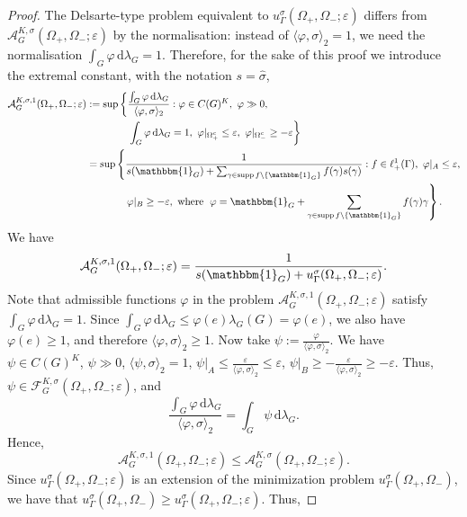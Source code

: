 \documentclass[[a4paper,english,12pt]{amsart}
\theoremstyle{plain}
\theoremstyle{remark}
\newcommand\supp{\operatorname{supp}}
\newcommand{\ff}{\varphi}
\begin{document}
\begin{proof}
The Delsarte-type problem equivalent to $u_\Gamma^{\sigma}(\Omega_+, \Omega_-;\varepsilon)$ differs from $\mathcal{A}^{K,\sigma}_G(\Omega_+, \Omega_-;\varepsilon)$ by the normalisation: instead of $\langle \ff, \sigma \rangle_2 = 1$, we need the normalisation $\int_G \ff \,\mbox{d}\lambda_G =1$. Therefore, for the sake of this proof we introduce the extremal constant, with the notation $s = \widehat{\sigma}$,
\begin{align*}
\mathcal{A}_G^{K,\sigma,1}(\Omega_+, \Omega_-; \varepsilon) & := 
\sup \left\{ \frac{\int_G \ff \,\mbox{d} \lambda_G}{\langle \ff, \sigma \rangle_2} : \ff \in C(G)^K, \ \ff \gg 0, \right.\\
& \left.
\hspace{14mm} \int_G \ff \,\mbox{d}\lambda_G =1, \ \ff|_{\Omega_+^c} \le \varepsilon, \ \ff|_{\Omega_-^c} \ge -\varepsilon
\right\} 
 \\
& = \sup \left\{ \frac{ 1 }{ s(\mathbbm{1}_G) + \sum_{\gamma \in \supp{f} \setminus \{\mathbbm{1}_G\}} f(\gamma) s(\gamma) }  : \right.   f \in \ell^1_+(\Gamma), \
\varphi|_A \le \varepsilon, \\ 
& \hspace{14mm} \varphi|_B \ge -\varepsilon, \text{ where }\left. \varphi = \mathbbm{1}_G + \sum_{\gamma \in \supp{f} \setminus \{\mathbbm{1}_G\}} f(\gamma) \gamma
\right\}.
\end{align*}
We have
$$
\mathcal{A}_G^{K,\sigma,1}(\Omega_+, \Omega_-;\varepsilon) = \frac{1}{s(\mathbbm{1}_G) + u_\Gamma^{\sigma}(\Omega_+, \Omega_-;\varepsilon)}.
$$
Note that admissible functions $\varphi$ in the problem $\mathcal{A}_G^{K,\sigma,1}(\Omega_+, \Omega_-;\varepsilon)$ satisfy $\int_G \varphi \,\mbox{d}\lambda_G = 1$. Since  $\int_G \varphi \,\mbox{d}\lambda_G \le \varphi(e) \lambda_G(G) = \varphi(e)$, we also have $\varphi(e) \ge 1$, and therefore $\langle \ff, \sigma \rangle_2 \ge 1$. Now take $\psi := \frac{\varphi}{\langle \ff, \sigma \rangle_2}$. We have $\psi \in C(G)^K$, $\psi \gg 0$, $\langle \psi, \sigma \rangle_2 = 1$, $\psi|_A \le \frac{\varepsilon}{\langle \ff, \sigma \rangle_2} \le \varepsilon$, $\psi|_B \ge -\frac{\varepsilon}{\langle \ff, \sigma \rangle_2} \ge -\varepsilon$. 
Thus, $\psi \in \mathcal{F}^{K,\sigma}_G(\Omega_+, \Omega_-; \varepsilon)$, and
$$
\frac{\int_G \ff \, \mbox{d}\lambda_G}{\langle \ff, \sigma \rangle_2} = \int_G \psi \, \mbox{d}\lambda_G.
$$
Hence,
$$
\mathcal{A}_G^{K,\sigma,1}(\Omega_+, \Omega_-;\varepsilon) \le \mathcal{A}^{K,\sigma}_G(\Omega_+, \Omega_-;\varepsilon).
$$
Since $u_\Gamma^{\sigma}(\Omega_+, \Omega_-;\varepsilon)$ is an extension of the minimization problem $u_\Gamma^\sigma(\Omega_+,\Omega_-)$, we have that $u_\Gamma^{\sigma}(\Omega_+, \Omega_-) \ge u_\Gamma^{\sigma}(\Omega_+, \Omega_-;\varepsilon)$. Thus,

\end{proof}
\end{document}

